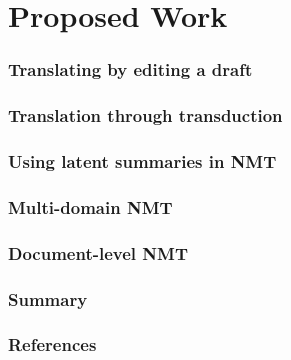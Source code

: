 \documentclass[xetex,aspectratio=169,xcolor,professionalfonts,hyperref]{beamer}
\begin{document}


\section{Proposed Work}

\begin{frame}
    \frametitle{Translating by editing a draft}
\end{frame}

\begin{frame}
    \frametitle{Translation through transduction}
\end{frame}

\begin{frame}
    \frametitle{Using latent summaries in NMT}
\end{frame}

\begin{frame}
    \frametitle{Multi-domain NMT}
\end{frame}

\begin{frame}
    \frametitle{Document-level NMT}
\end{frame}

\begin{frame}
    \frametitle{Summary}
\end{frame}

\begin{frame}[t,allowframebreaks]
\frametitle{References}
\printbibliography
\end{frame}
\end{document}
